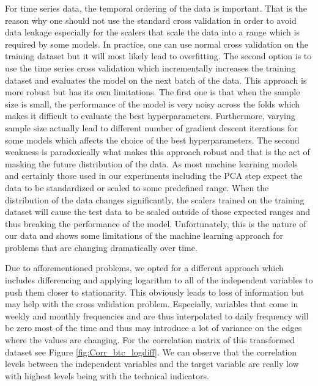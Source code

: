For time series data, the temporal ordering of the data is important.
That is the reason why one should not use the standard cross validation
in order to avoid data leakage especially 
for the scalers that scale the data into a range
which is required by some models. In practice, 
one can use normal cross validation on the training dataset
but it will most likely lead to overfitting.
The second option is to use the time series cross validation
which incrementally increases the training dataset 
and evaluates the model on the next batch of the data.
This approach is more robust but has its own limitations.
The first one is that when the sample size is small, 
the performance of the model is very noisy across the folds
which makes it difficult to evaluate the best hyperparameters. 
Furthermore, varying sample size actually 
lead to different number of gradient descent iterations
for some models which affects the choice of the best hyperparameters.
The second weakness is paradoxically what
makes this approach robust and that is the
act of masking the future distribution of the data.
As most machine learning models and certainly 
those used in our experiments including the \ac{PCA} step
expect the data to be standardized
or scaled to some predefined range.
When the distribution of the data changes
significantly, the scalers trained on the training dataset
will cause the test data to be scaled
outside of those expected ranges and thus breaking the 
performance of the model. 
Unfortunately,
this is the nature of our data 
and shows some limitations of the machine learning approach 
for problems that are changing dramatically over time.


Due to afforementioned problems, we opted for a different approach
which includes differencing and applying logarithm to all of
the independent variables to push them closer to stationarity.
This obviously leads to loss of information 
but may help with the cross validation problem.
Especially, variables that come in weekly and monthly frequencies
and are thus interpolated to daily frequency
will be zero most of the time and thus
may introduce a lot of variance on the edges where the values
are changing. For the correlation matrix of this transformed 
dataset see Figure \ref{fig:Corr_btc_logdiff}. We can 
observe that the correlation levels between the independent variables
and the target variable are really low with highest 
levels being with the technical indicators.

